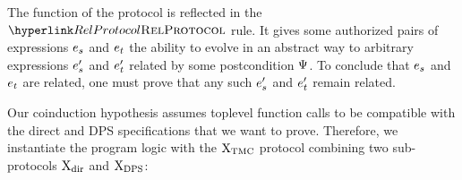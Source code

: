 The function of the protocol is reflected in the $\RefTirName{RelProtocol}$ rule.
It gives some authorized pairs of expressions $\datalangExpr_s$ and $\datalangExpr_t$ the ability to evolve in an abstract way to arbitrary expressions $\datalangExpr_s'$ and $\datalangExpr_t'$ related by some postcondition $\Psi$.
To conclude that $\datalangExpr_s$ and $\datalangExpr_t$ are related, one must prove that any such $\datalangExpr_s'$ and $\datalangExpr_t'$ remain related.

Our coinduction hypothesis assumes toplevel function calls to be compatible with the direct and DPS specifications that we want to prove.
Therefore, we instantiate the program logic with the $\mathrm{X}_\mathrm{TMC}$ protocol combining two sub-protocols $\mathrm{X}_\mathrm{dir}$ and $\mathrm{X}_\mathrm{DPS}$:

\medskip
